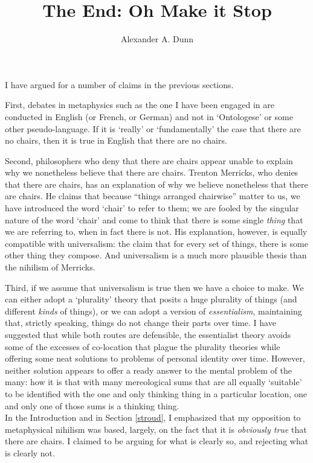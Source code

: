 \documentclass[11pt]{article}
\title{The End: Oh Make it Stop}
\author{Alexander A. Dunn}
\begin{document}
\ifstandalone
\maketitle
\begin{spacing}{1.5}
\fi

I have argued for a number of claims in the previous sections.

First, debates in metaphysics such as the one I have been engaged in
are conducted in English (or French, or German) and not in
`Ontologese' or some other pseudo-language.  If it is `really' or
`fundamentally' the case that there are no chairs, then it is true in
English that there are no chairs.

Second, philosophers who deny that there are chairs appear unable to
explain why we nonetheless believe that there are chairs.  Trenton
Merricks, who denies that there are chairs, has an explanation of why
we believe nonetheless that there are chairs.  He claims that because
``things arranged chairwise'' matter to us, we have introduced the
word `chair' to refer to them; we are fooled by the singular nature of
the word `chair' and come to think that there is some single {\em
  thing} that we are referring to, when in fact there is not.  His
explanation, however, is equally compatible with universalism: the
claim that for every set of things, there is some other thing they
compose.  And universalism is a much more plausible thesis than the
nihilism of Merricks.

Third, if we assume that universalism is true then we have a choice to
make.  We can either adopt a `plurality' theory that posits a huge
plurality of things (and different {\em kinds} of things), or we can
adopt a version of {\em essentialism}, maintaining that, strictly
speaking, things do not change their parts over time.  I have
suggested that while both routes are defensible, the essentialist
theory avoids some of the excesses of co-location that plague the
plurality theories while offering some neat solutions to problems of
personal identity over time.  However, neither solution appears to
offer a ready answer to the mental problem of the many: how it is that
with many mereological sums that are all equally `suitable' to be
identified with the one and only thinking thing in a particular
location, one and only one of those sums is a thinking thing. \\

In the Introduction and in Section \ref{stroud}, I emphasized that my
opposition to metaphysical nihilism was based, largely, on the fact
that it is {\em obviously true} that there are chairs.  I claimed to
be arguing for what is clearly so, and rejecting what is clearly not.


\end{spacing}
\end{document}
